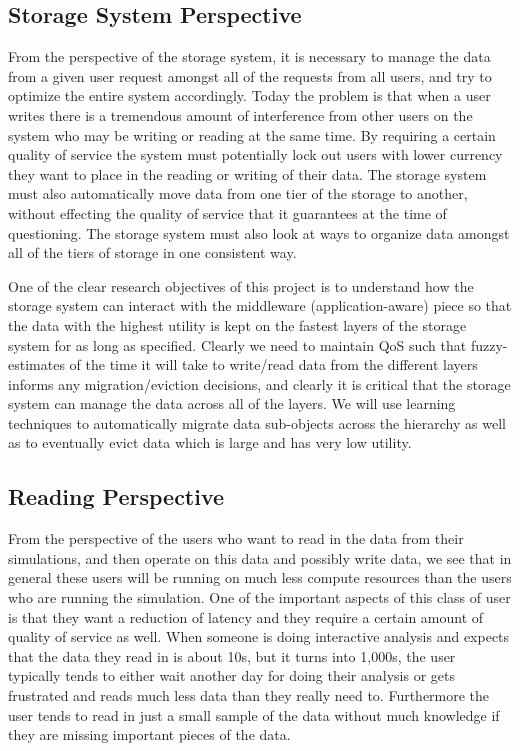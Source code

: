 \subsection{Storage System Perspective}
\label{subsec:storage-perspective}
From the perspective of the storage system, it is necessary to manage the data from
a given user request amongst all of the requests from all users, and try to optimize the
entire system accordingly. Today the problem is that when a user writes there is a
tremendous amount of interference from other users on the system who may be
writing or reading at the same time. By requiring a certain quality
of service the system must potentially lock out users with lower currency
they want to place in the reading or writing of their data. The storage
system must also automatically move data from one tier of the storage to
another, without effecting the quality of service that it guarantees at the
time of questioning. The storage system must also look at ways to organize
data amongst all of the tiers of storage in one consistent way.

One of the clear research objectives of this project is to understand how the
storage system can interact with the middleware (application-aware) piece so
that the data with the highest utility is kept on the fastest layers of the
storage system for as long as specified. Clearly we need to maintain 
QoS such that fuzzy-estimates of the time it will take to write/read data from
the different layers informs any migration/eviction decisions, and clearly it
is critical that the storage system can manage the data across all of the
layers. We will use learning techniques to automatically migrate data
sub-objects across the hierarchy as well as to eventually evict data which is
large and has very low utility.


\subsection{Reading  Perspective}
\label{subsec:reading-perspective}
From the perspective of the users who want to read in the data from their
simulations, and then operate on this data and possibly write data, we see
that in general these users will be running on much less compute resources
than the users who are running the simulation. One of the important aspects
of this class of user is that they want a reduction of latency and they
require a certain amount of quality of service as well. When someone is
doing interactive analysis and expects that the data they read in is about
10s, but it turns into 1,000s, the user typically tends to either wait
another day for doing their analysis or gets frustrated and reads much less
data than they really need to. Furthermore the user tends to read in just a
small sample of the data without much knowledge if they are missing
important pieces of the data.

